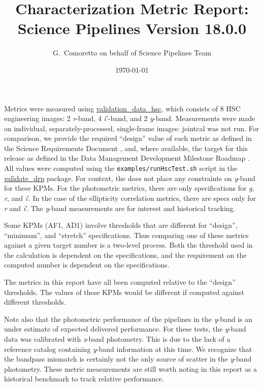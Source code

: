 \documentclass[DM,lsstdraft,toc]{lsstdoc}
\title[V18.0.0 Characterization Report]{Characterization Metric Report: Science Pipelines Version 18.0.0}
\author{G.~Comoretto on behalf of Science Pipelines Team}
\date{\today}
\begin{document}

\maketitle

Metrics were measured using \href{https://github.com/lsst/validation_data_hsc}{validation\_data\_hsc}, which consists of 8 HSC engineering images: 2 \emph{r}-band, 4 \emph{i}'-band, and 2 \emph{y}-band. Measurements were made on individual, separately-processed, single-frame images: jointcal was not run. For comparison, we provide the \SRD required ``design'' value of each metric as defined in the Science Requirements Document , and, where available, the target for this release as defined in the Data Management Development Milestone Roadmap . All values were computed using the \texttt{examples/runHscTest.sh} script in the \href{https://github.com/lsst/validate_drp}{validate\_drp} package. For context, the \SRD does not place any constraints on \emph{y}-band for these KPMs.  For the photometric metrics, there are only specifications for \emph{g}, \emph{r}, and \emph{i}'. In the case of the ellipticity correlation metrics, there are specs only for \emph{r} and \emph{i}'. The \emph{y}-band measurements are for interest and historical tracking.

Some KPMs (AF1, AD1) involve thresholds that are different for ``design'', ``minimum'', and ``stretch'' specifications. Thus comparing one of these metrics against a given target number is a two-level process. Both the threshold used in the calculation is dependent on the specifications, and the requirement on the computed number is dependent on the specifications.

The metrics in this report have all been computed relative to the ``design'' thresholds. The values of these KPMs would be different if computed against different thresholds.

Note also that the photometric performance of the pipelines in the \emph{y}-band is an under estimate of expected delivered performance.  For these tests, the \emph{y}-band data was calibrated with \emph{z}-band photometry.  This is due to the lack of a reference catalog containing \emph{y}-band information at this time. We recognize that the bandpass mismatch is certainly not the only source of scatter in the \emph{y}-band photometry. These metric measurements are still worth noting in this report as a historical benchmark to track relative performance.
\end{document}
